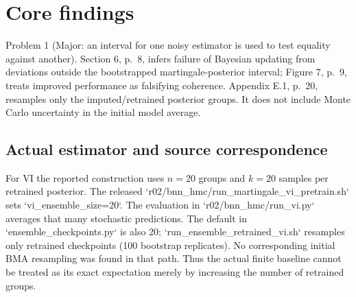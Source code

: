 \documentclass[10pt]{article}
\begin{document}
\section*{Core findings}
Problem 1 (Major: an interval for one noisy estimator is used to test equality against another).  Section 6, p. 8, infers failure of Bayesian updating from deviations outside the bootstrapped martingale-posterior interval; Figure 7, p. 9, treats improved performance as falsifying coherence. Appendix E.1, p. 20, resamples only the imputed/retrained posterior groups. It does not include Monte Carlo uncertainty in the initial model average.\par
\subsection*{Actual estimator and source correspondence}
For VI the reported construction uses \(n=20\) groups and \(k=20\) samples per retrained posterior. The released `r02/bnn\_hmc/run\_martingale\_vi\_pretrain.sh` sets `vi\_ensemble\_size=20`. The evaluation in `r02/bnn\_hmc/run\_vi.py` averages that many stochastic predictions. The default in `ensemble\_checkpoints.py` is also 20; `run\_ensemble\_retrained\_vi.sh` resamples only retrained checkpoints (100 bootstrap replicates). No corresponding initial BMA resampling was found in that path. Thus the actual finite baseline cannot be treated as its exact expectation merely by increasing the number of retrained groups.\par
\end{document}
